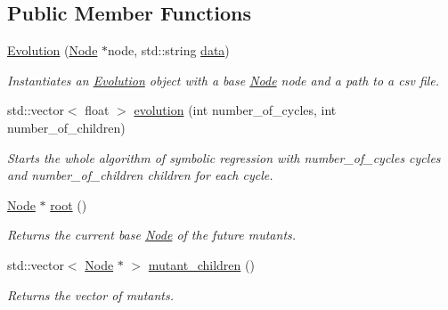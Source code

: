 \subsection*{Public Member Functions}
\begin{DoxyCompactItemize}
\item 
\mbox{\label{classEvolution_a0502489a07abf6f9bbc72cfcf4767c3e}} 
\hyperlink{classEvolution_a0502489a07abf6f9bbc72cfcf4767c3e}{Evolution} (\hyperlink{classNode}{Node} $\ast$node, std\+::string \hyperlink{classEvolution_afb925477cdd6c8703304a037208e64e1}{data})
\begin{DoxyCompactList}\small\item\em Instantiates an \hyperlink{classEvolution}{Evolution} object with a base \hyperlink{classNode}{Node} node and a path to a csv file. \end{DoxyCompactList}\item 
\mbox{\label{classEvolution_acb98a24071fe199644585c6192bed933}} 
std\+::vector$<$ float $>$ \hyperlink{classEvolution_acb98a24071fe199644585c6192bed933}{evolution} (int number\+\_\+of\+\_\+cycles, int number\+\_\+of\+\_\+children)
\begin{DoxyCompactList}\small\item\em Starts the whole algorithm of symbolic regression with number\+\_\+of\+\_\+cycles cycles and number\+\_\+of\+\_\+children children for each cycle. \end{DoxyCompactList}\item 
\mbox{\label{classEvolution_a83182c1db463268e933cc0ca9c46d056}} 
\hyperlink{classNode}{Node} $\ast$ \hyperlink{classEvolution_a83182c1db463268e933cc0ca9c46d056}{root} ()
\begin{DoxyCompactList}\small\item\em Returns the current base \hyperlink{classNode}{Node} of the future mutants. \end{DoxyCompactList}\item 
\mbox{\label{classEvolution_a98ea253854899bea05cdb0c13a7eb85a}} 
std\+::vector$<$ \hyperlink{classNode}{Node} $\ast$ $>$ \hyperlink{classEvolution_a98ea253854899bea05cdb0c13a7eb85a}{mutant\+\_\+children} ()
\begin{DoxyCompactList}\small\item\em Returns the vector of mutants. \end{DoxyCompactList}\item 

\end{DoxyCompactItemize}
